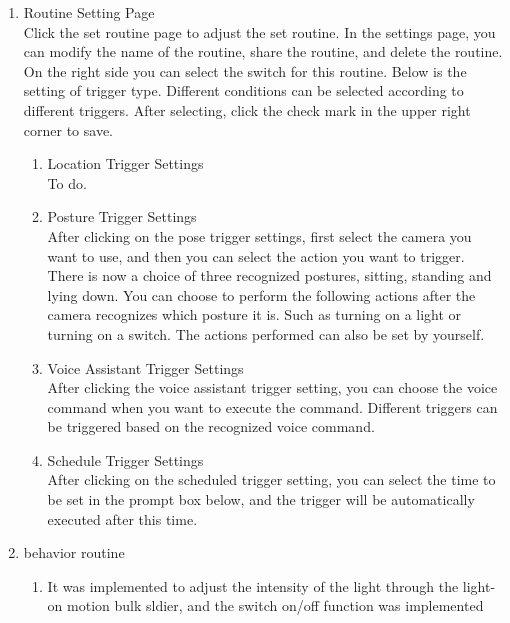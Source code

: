 \begin{enumerate}[label=\arabic*.]
\begin{enumerate}[label=\alph*]
            
        \item Routine Setting Page\\
            Click the set routine page to adjust the set routine. In the settings page, you can modify the name of the routine, share the routine, and delete the routine. On the right side you can select the switch for this routine. Below is the setting of trigger type. Different conditions can be selected according to different triggers. After selecting, click the check mark in the upper right corner to save.\\
            \begin{enumerate}
                \item  Location Trigger Settings\\
                    To do.\\
                \item  Posture Trigger Settings\\
                    After clicking on the pose trigger settings, first select the camera you want to use, and then you can select the action you want to trigger. There is now a choice of three recognized postures, sitting, standing and lying down. You can choose to perform the following actions after the camera recognizes which posture it is. Such as turning on a light or turning on a switch. The actions performed can also be set by yourself.\\
                \item  Voice Assistant Trigger Settings\\
                    After clicking the voice assistant trigger setting, you can choose the voice command when you want to execute the command. Different triggers can be triggered based on the recognized voice command.\\
                \item  Schedule Trigger Settings\\
                    After clicking on the scheduled trigger setting, you can select the time to be set in the prompt box below, and the trigger will be automatically executed after this time.\\
            \end{enumerate}
            
        \item behavior routine
        \begin{enumerate}
            \item It was implemented to adjust the intensity of the light through the light-on motion bulk sldier, and the switch on/off function was implemented\\
            


\end{enumerate}
\end{enumerate}
\end{enumerate}
